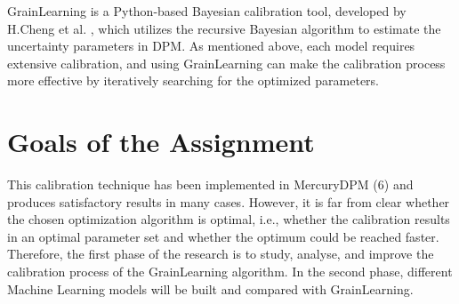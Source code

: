 \documentclass{article}
\begin{document}
GrainLearning is a Python-based Bayesian calibration tool, developed by H.Cheng et al. \cite{grainLearning}, which utilizes the recursive Bayesian algorithm to estimate the uncertainty parameters in DPM. As mentioned above, each model requires extensive calibration, and using GrainLearning can make the calibration process more effective by iteratively searching for the optimized parameters. 

\section{Goals of the Assignment}

This calibration technique has been implemented in MercuryDPM (6) and produces satisfactory results in many cases. However, it is far from clear whether the chosen optimization algorithm is optimal, i.e., whether the calibration results in an optimal parameter set and whether the optimum could be reached faster. Therefore, the first phase of the research is to study, analyse, and improve the calibration process of the GrainLearning algorithm. In the second phase, different Machine Learning models will be built and compared with GrainLearning. 



\end{document}

